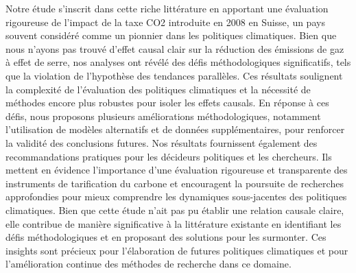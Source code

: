 Notre étude s'inscrit dans cette riche littérature en apportant une évaluation rigoureuse de l'impact de la taxe CO2 introduite en 2008 en Suisse, un pays souvent considéré comme un pionnier dans les politiques climatiques. Bien que nous n'ayons pas trouvé d'effet causal clair sur la réduction des émissions de gaz à effet de serre, nos analyses ont révélé des défis méthodologiques significatifs, tels que la violation de l’hypothèse des tendances parallèles. Ces résultats soulignent la complexité de l'évaluation des politiques climatiques et la nécessité de méthodes encore plus robustes pour isoler les effets causals. En réponse à ces défis, nous proposons plusieurs améliorations méthodologiques, notamment l'utilisation de modèles alternatifs et de données supplémentaires, pour renforcer la validité des conclusions futures. Nos résultats fournissent également des recommandations pratiques pour les décideurs politiques et les chercheurs. Ils mettent en évidence l'importance d'une évaluation rigoureuse et transparente des instruments de tarification du carbone et encouragent la poursuite de recherches approfondies pour mieux comprendre les dynamiques sous-jacentes des politiques climatiques. Bien que cette étude n'ait pas pu établir une relation causale claire, elle contribue de manière significative à la littérature existante en identifiant les défis méthodologiques et en proposant des solutions pour les surmonter. Ces insights sont précieux pour l'élaboration de futures politiques climatiques et pour l'amélioration continue des méthodes de recherche dans ce domaine.



